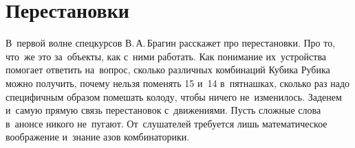 
\section*{Перестановки}


В~первой волне спецкурсов В.\,А.\,Брагин расскажет про перестановки.
Про то, что~же это за~объекты, как с~ними работать.
Как понимание их~устройства помогает ответить на~вопрос, сколько различных
комбинаций Кубика Рубика можно получить, почему нельзя поменять 15 и~14
в~пятнашках, сколько раз надо специфичным образом помешать  колоду, чтобы
ничего не~изменилось.
Заденем и~самую прямую связь перестановок с~движениями.
Пусть сложные слова в~анонсе никого не~пугают.
От~слушателей требуется лишь математическое воображение и~знание азов
комбинаторики.

\bigskip


\begin{center}
\quad
{}
\end{center}

